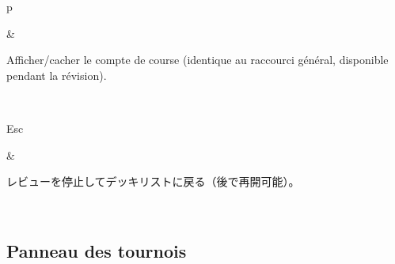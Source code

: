 \documentclass[letterpaper,10pt,dvipdfmx]{sphinxmanual}
\begin{document}
\begin{savenotes}
\begin{tabular}[t]{}
\begin{varwidth}[t]{}
p
\sphinxbeforeendvarwidth
\end{varwidth}%
&\begin{varwidth}[t]{}
\sphinxAtStartPar
Afficher/cacher le compte de course (identique au raccourci général, disponible pendant la révision).
\sphinxbeforeendvarwidth
\end{varwidth}%
\\
\sphinxhline\begin{varwidth}[t]{}
\sphinxAtStartPar
Esc
\sphinxbeforeendvarwidth
\end{varwidth}%
&\begin{varwidth}[t]{}
\sphinxAtStartPar
レビューを停止してデッキリストに戻る（後で再開可能）。
\sphinxbeforeendvarwidth
\end{varwidth}%
\\
\sphinxbottomrule
\end{tabular}
\sphinxtableafterendhook\par
\sphinxattableend\end{savenotes}


\subsection{Panneau des tournois}
\label{\detokenize{raccourcis:panneau-des-tournois}}\label{\detokenize{raccourcis:raccourcis-tournament-panel}}
\end{document}
